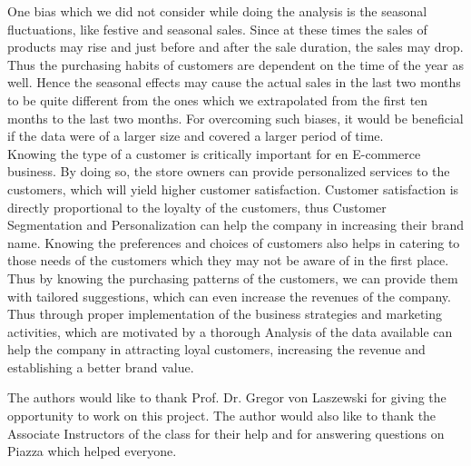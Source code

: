 One bias which we did not consider while doing the analysis is the seasonal fluctuations, like festive and seasonal sales. Since at these times the sales of products may rise and just before and after the sale duration, the sales may drop. Thus the purchasing habits of customers are dependent on the time of the year as well. Hence the seasonal effects may cause the actual sales in the last two months to be quite different from the ones which we extrapolated  from the first ten months to the last two months. For overcoming such biases, it would be beneficial if the data were of a larger size and covered a larger period of time.\\
Knowing the type of a customer is critically important for en E-commerce business. By doing so, the store owners can provide personalized services to the customers, which will yield higher customer satisfaction. Customer satisfaction is directly proportional to the loyalty of the customers, thus Customer Segmentation and Personalization can help the company in increasing their brand name. Knowing the preferences and choices of customers also helps in catering to those needs of the customers which they may not be aware of in the first place. Thus by knowing the purchasing patterns of the customers, we can provide them with tailored suggestions, which can even increase the revenues of the company. Thus through proper implementation of the business strategies and marketing activities, which are motivated by a thorough Analysis of the data available can help the company in attracting loyal customers, increasing the revenue and establishing a better brand value.  

\begin{acks}
  The authors would like to thank Prof. Dr. Gregor von Laszewski for giving the opportunity to work on this project.
  The author would also like to thank the Associate Instructors of the class for their help and for answering questions on Piazza which helped everyone.
\end{acks}



